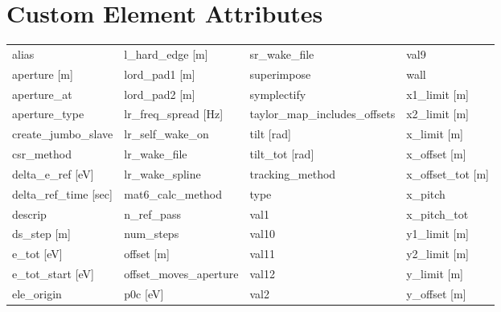  \section{Custom Element Attributes}
 \label{s:list.custom}
 
 \begin{tabular}{llll} \toprule
alias                          & l_hard_edge [m]                & sr_wake_file                   & val9                           \\
aperture [m]                   & lord_pad1 [m]                  & superimpose                    & wall                           \\
aperture_at                    & lord_pad2 [m]                  & symplectify                    & x1_limit [m]                   \\
aperture_type                  & lr_freq_spread [Hz]            & taylor_map_includes_offsets    & x2_limit [m]                   \\
create_jumbo_slave             & lr_self_wake_on                & tilt [rad]                     & x_limit [m]                    \\
csr_method                     & lr_wake_file                   & tilt_tot [rad]                 & x_offset [m]                   \\
delta_e_ref [eV]               & lr_wake_spline                 & tracking_method                & x_offset_tot [m]               \\
delta_ref_time [sec]           & mat6_calc_method               & type                           & x_pitch                        \\
descrip                        & n_ref_pass                     & val1                           & x_pitch_tot                    \\
ds_step [m]                    & num_steps                      & val10                          & y1_limit [m]                   \\
e_tot [eV]                     & offset [m]                     & val11                          & y2_limit [m]                   \\
e_tot_start [eV]               & offset_moves_aperture          & val12                          & y_limit [m]                    \\
ele_origin                     & p0c [eV]                       & val2                           & y_offset [m]                   \\

\end{tabular}
